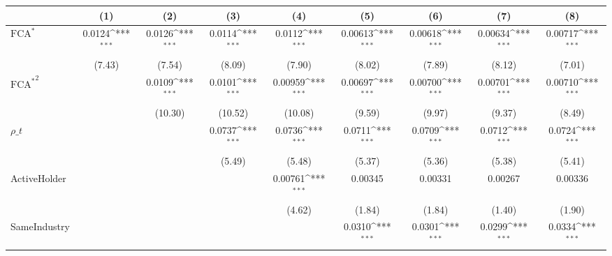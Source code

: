 {
\def\sym#1{\ifmmode^{#1}\else\(^{#1}\)\fi}
\begin{tabular}{l*{8}{c}}
\hline\hline
                    &\multicolumn{1}{c}{(1)}         &\multicolumn{1}{c}{(2)}         &\multicolumn{1}{c}{(3)}         &\multicolumn{1}{c}{(4)}         &\multicolumn{1}{c}{(5)}         &\multicolumn{1}{c}{(6)}         &\multicolumn{1}{c}{(7)}         &\multicolumn{1}{c}{(8)}         \\
\hline
$ \text{FCA}^* $    &      0.0124\sym{***}&      0.0126\sym{***}&      0.0114\sym{***}&      0.0112\sym{***}&     0.00613\sym{***}&     0.00618\sym{***}&     0.00634\sym{***}&     0.00717\sym{***}\\
                    &      (7.43)         &      (7.54)         &      (8.09)         &      (7.90)         &      (8.02)         &      (7.89)         &      (8.12)         &      (7.01)         \\
[1em]
 $ { \text{FCA} ^ * } ^2 $&                     &      0.0109\sym{***}&      0.0101\sym{***}&     0.00959\sym{***}&     0.00697\sym{***}&     0.00700\sym{***}&     0.00701\sym{***}&     0.00710\sym{***}\\
                    &                     &     (10.30)         &     (10.52)         &     (10.08)         &      (9.59)         &      (9.97)         &      (9.37)         &      (8.49)         \\
[1em]
$ \rho\_t $          &                     &                     &      0.0737\sym{***}&      0.0736\sym{***}&      0.0711\sym{***}&      0.0709\sym{***}&      0.0712\sym{***}&      0.0724\sym{***}\\
                    &                     &                     &      (5.49)         &      (5.48)         &      (5.37)         &      (5.36)         &      (5.38)         &      (5.41)         \\
[1em]
ActiveHolder        &                     &                     &                     &     0.00761\sym{***}&     0.00345         &     0.00331         &     0.00267         &     0.00336         \\
                    &                     &                     &                     &      (4.62)         &      (1.84)         &      (1.84)         &      (1.40)         &      (1.90)         \\
[1em]
SameIndustry        &                     &                     &                     &                     &      0.0310\sym{***}&      0.0301\sym{***}&      0.0299\sym{***}&      0.0334\sym{***}\\

\end{tabular}}
